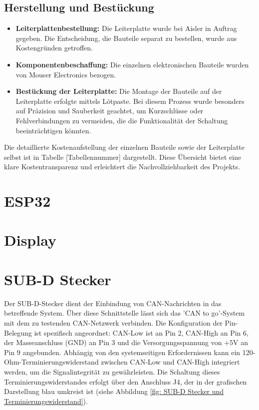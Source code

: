 \subsection{Herstellung und Bestückung}
\begin{itemize}
    \item \textbf{Leiterplattenbestellung:} Die Leiterplatte wurde bei Aisler in Auftrag gegeben. Die Entscheidung, die Bauteile separat zu bestellen, wurde aus Kostengründen getroffen.
    \item \textbf{Komponentenbeschaffung:} Die einzelnen elektronischen Bauteile wurden von Mouser Electronics bezogen.
    \item \textbf{Bestückung der Leiterplatte:} Die Montage der Bauteile auf der Leiterplatte erfolgte mittels Lötpaste. Bei diesem Prozess wurde besonders auf Präzision und Sauberkeit geachtet, um Kurzschlüsse oder Fehlverbindungen zu vermeiden, die die Funktionalität der Schaltung beeinträchtigen könnten.
\end {itemize}

\noindent Die detaillierte Kostenaufstellung der einzelnen Bauteile sowie der Leiterplatte selbst ist in Tabelle [Tabellennummer] dargestellt. Diese Übersicht bietet eine klare Kostentransparenz und erleichtert die Nachvollziehbarkeit des Projekts.\\

\section{ESP32}

\section{Display}

\section{SUB-D Stecker}
\noindent Der SUB-D-Stecker dient der Einbindung von CAN-Nachrichten in das betreffende System. Über diese Schnittstelle lässt sich das 'CAN to go'-System mit dem zu testenden CAN-Netzwerk verbinden. Die Konfiguration der Pin-Belegung ist spezifisch angeordnet: CAN-Low ist an Pin 2, CAN-High an Pin 6, der Masseanschluss (GND) an Pin 3 und die Versorgungsspannung von +5V an Pin 9 angebunden. Abhängig von den systemseitigen Erfordernissen kann ein 120-Ohm-Terminierungswiderstand zwischen CAN-Low und CAN-High integriert werden, um die Signalintegrität zu gewährleisten. Die Schaltung dieses Terminierungswiderstandes erfolgt über den Anschluss J4, der in der grafischen Darstellung blau umkreist ist (siehe Abbildung \ref{fig: SUB-D Stecker und Terminierungswiderstand}).\\

